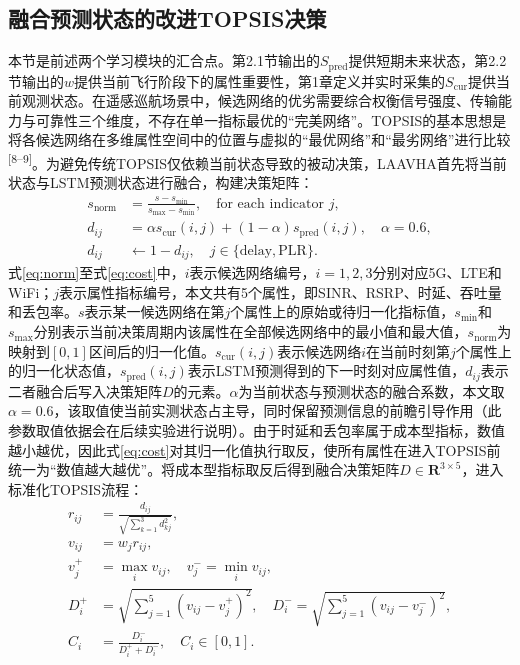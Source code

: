 \documentclass[10pt,a4paper]{ctexart}
\newcommand{\upcite}[1]{\textsuperscript{[#1]}}
\begin{document}
\subsection{融合预测状态的改进TOPSIS决策}

本节是前述两个学习模块的汇合点。第2.1节输出的$S_{\mathrm{pred}}$提供短期未来状态，第2.2节输出的$w$提供当前飞行阶段下的属性重要性，第1章定义并实时采集的$S_{\mathrm{cur}}$提供当前观测状态。在遥感巡航场景中，候选网络的优劣需要综合权衡信号强度、传输能力与可靠性三个维度，不存在单一指标最优的``完美网络''。TOPSIS的基本思想是将各候选网络在多维属性空间中的位置与虚拟的``最优网络''和``最劣网络''进行比较\upcite{8--9}。为避免传统TOPSIS仅依赖当前状态导致的被动决策，LAAVHA首先将当前状态与LSTM预测状态进行融合，构建决策矩阵：
\begin{align}
s_{\mathrm{norm}} &= \frac{s-s_{\min}}{s_{\max}-s_{\min}},\quad \text{for each indicator }j, \label{eq:norm}\\
d_{ij} &= \alpha s_{\mathrm{cur}}(i,j)+(1-\alpha)s_{\mathrm{pred}}(i,j),\quad \alpha=0.6, \label{eq:fuse}\\
d_{ij} &\leftarrow 1-d_{ij},\quad j\in\{\mathrm{delay},\mathrm{PLR}\}. \label{eq:cost}
\end{align}
式\eqref{eq:norm}至式\eqref{eq:cost}中，$i$表示候选网络编号，$i=1,2,3$分别对应5G、LTE和WiFi；$j$表示属性指标编号，本文共有5个属性，即SINR、RSRP、时延、吞吐量和丢包率。$s$表示某一候选网络在第$j$个属性上的原始或待归一化指标值，$s_{\min}$和$s_{\max}$分别表示当前决策周期内该属性在全部候选网络中的最小值和最大值，$s_{\mathrm{norm}}$为映射到$[0,1]$区间后的归一化值。$s_{\mathrm{cur}}(i,j)$表示候选网络$i$在当前时刻第$j$个属性上的归一化状态值，$s_{\mathrm{pred}}(i,j)$表示LSTM预测得到的下一时刻对应属性值，$d_{ij}$表示二者融合后写入决策矩阵$D$的元素。$\alpha$为当前状态与预测状态的融合系数，本文取$\alpha=0.6$，该取值使当前实测状态占主导，同时保留预测信息的前瞻引导作用（此参数取值依据会在后续实验进行说明）。由于时延和丢包率属于成本型指标，数值越小越优，因此式\eqref{eq:cost}对其归一化值执行取反，使所有属性在进入TOPSIS前统一为``数值越大越优''。将成本型指标取反后得到融合决策矩阵$D\in\mathbf{R}^{3\times5}$，进入标准化TOPSIS流程：
\begin{align}
r_{ij} &= \frac{d_{ij}}{\sqrt{\sum_{k=1}^{3}d_{kj}^{2}}}, \label{eq:topsis1}\\
v_{ij} &= w_j r_{ij}, \label{eq:topsis2}\\
v_j^+ &= \max_i v_{ij},\quad v_j^-=\min_i v_{ij}, \label{eq:topsis3}\\
D_i^+ &= \sqrt{\sum_{j=1}^{5}(v_{ij}-v_j^+)^2},\quad
D_i^-=\sqrt{\sum_{j=1}^{5}(v_{ij}-v_j^-)^2}, \label{eq:topsis4}\\
C_i &= \frac{D_i^-}{D_i^+ + D_i^-},\quad C_i\in[0,1]. \label{eq:topsis5}
\end{align}
\end{document}
